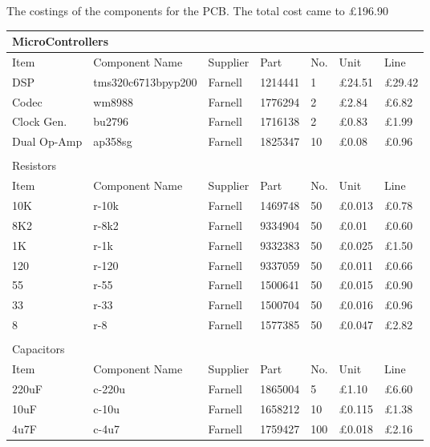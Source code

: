 The costings of the components for the PCB.
The total cost came to \pounds196.90

\begin{table}[H]
	\centering
	\begin{tabular}[c]{| l | l | l | p{50px} | l | l | l |}
		\hline
		\multicolumn{7}{|l|}{MicroControllers} \\
		\hline
		Item	& Component Name& Supplier & Part	& No.	& Unit  & Line \\
		\hline
		DSP	& tms320c6713bpyp200	& Farnell	& 1214441	& 1	& \pounds24.51	& \pounds29.42	\\
		Codec	& wm8988		& Farnell	& 1776294	& 2	& \pounds2.84	& \pounds6.82	\\
		Clock Gen.	& bu2796	& Farnell	& 1716138	& 2	& \pounds0.83	& \pounds1.99	\\
		Dual Op-Amp	& ap358sg	& Farnell	& 1825347	& 10	& \pounds0.08	& \pounds0.96	\\
		\hline
		\multicolumn{7}{|l|}{}\\
		\hline
		\multicolumn{7}{|l|}{Resistors} \\
		\hline
		Item	& Component Name& Supplier & Part	& No.	& Unit  & Line \\
		\hline
		10K\textohm	& r-10k	& Farnell	& 1469748	& 50	& \pounds0.013	& \pounds0.78	\\
		8K2\textohm	& r-8k2	& Farnell	& 9334904	& 50	& \pounds0.01	& \pounds0.60	\\
		1K\textohm	& r-1k	& Farnell	& 9332383	& 50	& \pounds0.025	& \pounds1.50	\\
		120\textohm	& r-120	& Farnell	& 9337059	& 50	& \pounds0.011	& \pounds0.66	\\
		55\textohm	& r-55	& Farnell	& 1500641	& 50	& \pounds0.015	& \pounds0.90	\\
		33\textohm	& r-33	& Farnell	& 1500704	& 50	& \pounds0.016	& \pounds0.96	\\
		8\textohm	& r-8	& Farnell	& 1577385	& 50	& \pounds0.047	& \pounds2.82	\\
		\hline
		\multicolumn{7}{|l|}{}\\
		\hline
		\multicolumn{7}{|l|}{Capacitors} \\
		\hline
		Item	& Component Name& Supplier & Part	& No.	& Unit  & Line  \\
		\hline
		220uF	& c-220u& Farnell	& 1865004	& 5	& \pounds1.10	& \pounds6.60	\\
		10uF	& c-10u	& Farnell	& 1658212	& 10	& \pounds0.115	& \pounds1.38	\\
		4u7F	& c-4u7	& Farnell	& 1759427	& 100	& \pounds0.018	& \pounds2.16	\\

\end{tabular}
\end{table}
